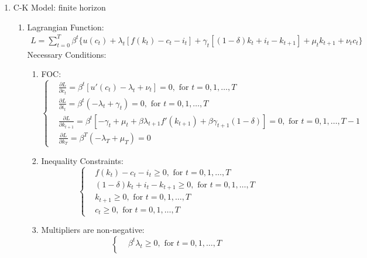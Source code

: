 \documentclass{article}
\begin{document}
\begin{enumerate}
\begin{enumerate}
    \end{enumerate}
	\item C-K Model: finite horizon
	\begin{enumerate}
        \item Lagrangian Function:
        \begin{multline*}
            L=\sum_{t=0}^{T}\beta^t\{u(c_t)+\lambda_t[f(k_t)-c_t-i_t]+\gamma_t[(1-\delta)k_t+i_t-k_{t+1}]+\mu_tk_{t+1}+\nu_tc_t\}
        \end{multline*}
        Necessary Conditions:
        \begin{enumerate}
            \item FOC:
            \begin{equation*}
                \left\{\begin{aligned}
                    &\frac{\partial L}{\partial c_t}=\beta^t[{u}'(c_t)-\lambda_t+\nu_t]=0,\text{ for }t=0,1,\dots,T\\
                    &\frac{\partial L}{\partial i_t}=\beta^t(-\lambda_t+\gamma_t)=0,\text{ for }t=0,1,\dots,T\\
                    &\frac{\partial L}{\partial k_{t+1}}=\beta^t[-\gamma_t+\mu_t+\beta\lambda_{t+1}{f}'(k_{t+1})+\beta\gamma_{t+1}(1-\delta)]=0,\text{ for }t=0,1,\dots,T-1\\
                    &\frac{\partial L}{\partial k_T}=\beta^T(-\lambda_T+\mu_T)=0
                \end{aligned}\right.
            \end{equation*}
            \item Inequality Constraints:
            \begin{equation*}
                \left\{\begin{aligned}
                    &f(k_t)-c_t-i_t\ge0,\text{ for }t=0,1,\dots,T\\
                    &(1-\delta)k_t+i_t-k_{t+1}\ge0,\text{ for }t=0,1,\dots,T\\
                    &k_{t+1}\ge0,\text{ for }t=0,1,\dots,T\\
                    &c_t\ge0,\text{ for }t=0,1,\dots,T
                \end{aligned}\right.
            \end{equation*}
            \item Multipliers are non-negative:
            \begin{equation*}
                \left\{\begin{aligned}
                    &\beta^t\lambda_t\ge0,\text{ for }t=0,1,\dots,T\\

\end{aligned}
\end{equation*}
\end{enumerate}
\end{enumerate}
\end{enumerate}
\end{document}
